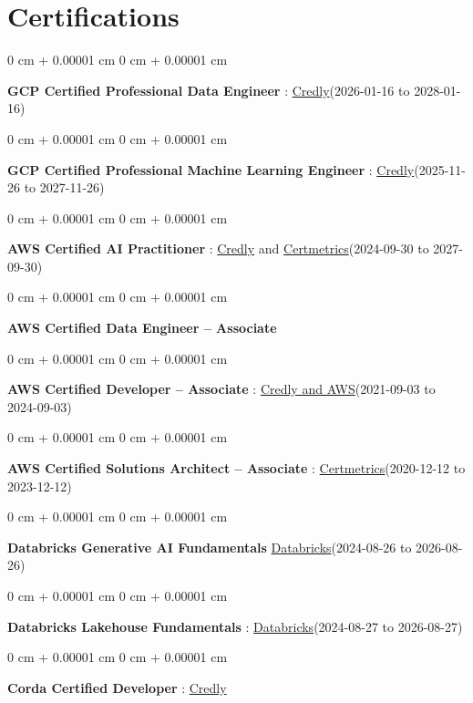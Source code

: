 \documentclass[10pt, letterpaper]{article}
\newenvironment{onecolentry}{
    \begin{adjustwidth}{
        0 cm + 0.00001 cm
    }{
        0 cm + 0.00001 cm
    }
}{
    \end{adjustwidth}
} %
\begin{document}
    \vspace{2 pt }
    \section{Certifications}
        \vspace{2 pt }
        \begin{samepage}
            \begin{onecolentry}
                \textbf{GCP Certified Professional Data Engineer} : \href{https://www.credly.com/badges/977e96d9-12e7-4f6c-b8a7-df71fb7153b8/public_url}{Credly}(2026-01-16 to 2028-01-16)
            \end{onecolentry}
            \begin{onecolentry}
                \textbf{GCP Certified Professional Machine Learning Engineer} : \href{https://www.credly.com/badges/a6965347-09ea-4d8f-b398-0e151407160d/public_url}{Credly}(2025-11-26 to 2027-11-26)
            \end{onecolentry}
            \begin{onecolentry}
                \textbf{AWS Certified AI Practitioner} : \href{https://www.credly.com/badges/451b7ba5-8be1-4a8e-bbec-ade26627a6b6/public_url}{Credly} and \href{https://cp.certmetrics.com/amazon/en/public/verify/credential/495f0d9853874bf9a33c17f8e89ce131}{Certmetrics}(2024-09-30 to 2027-09-30)
            \end{onecolentry}
            \begin{onecolentry}
                \textbf{AWS Certified Data Engineer – Associate}
            \end{onecolentry}
            \begin{onecolentry}
                \textbf{AWS Certified Developer – Associate} : \href{https://www.credly.com/badges/b8106fbd-d3d1-4204-8cdf-e708798fd582/public_url}{Credly and AWS}(2021-09-03  to 2024-09-03)
            \end{onecolentry}
            \begin{onecolentry}
                \textbf{AWS Certified Solutions Architect – Associate} : \href{https://cp.certmetrics.com/amazon/en/public/verify/credential/SNBY48EBJJVE1SWX}{Certmetrics}(2020-12-12 to 2023-12-12)
            \end{onecolentry}
            \begin{onecolentry}
                \textbf{Databricks Generative AI Fundamentals} \href{https://sgq.io/3uIFGNi}{Databricks}(2024-08-26 to 2026-08-26)
            \end{onecolentry}
            \begin{onecolentry}
                \textbf{Databricks Lakehouse Fundamentals} : \href{https://scl.io/FXGKS0u}{Databricks}(2024-08-27 to 2026-08-27)
            \end{onecolentry}
            \begin{onecolentry}
                \textbf{Corda Certified Developer} : \href{https://www.credly.com/badges/7f29d39c-34b6-4de9-b07d-e10f1090a335/linked_in_profile}{Credly}
            \end{onecolentry}
        \end{samepage}
\end{document}
